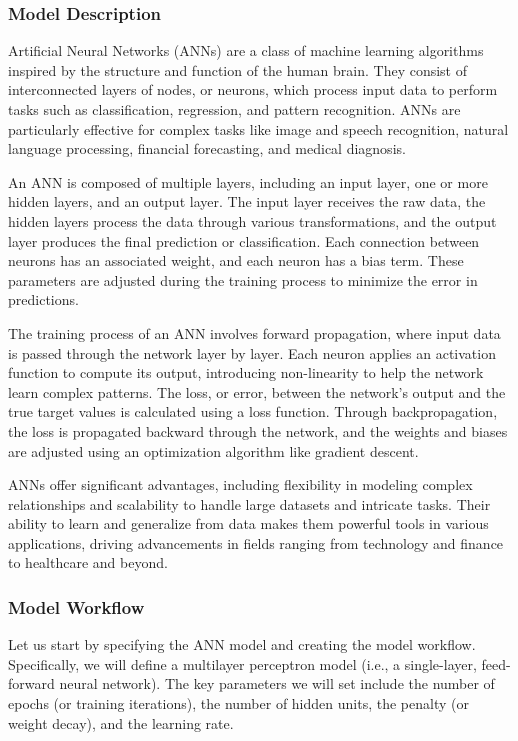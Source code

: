 \documentclass[
  letterpaper,
  DIV=11,
  numbers=noendperiod]{scrartcl}
\begin{document}
\subsubsection{Model Description}\label{model-description-2}

Artificial Neural Networks (ANNs) are a class of machine learning
algorithms inspired by the structure and function of the human brain.
They consist of interconnected layers of nodes, or neurons, which
process input data to perform tasks such as classification, regression,
and pattern recognition. ANNs are particularly effective for complex
tasks like image and speech recognition, natural language processing,
financial forecasting, and medical diagnosis.

An ANN is composed of multiple layers, including an input layer, one or
more hidden layers, and an output layer. The input layer receives the
raw data, the hidden layers process the data through various
transformations, and the output layer produces the final prediction or
classification. Each connection between neurons has an associated
weight, and each neuron has a bias term. These parameters are adjusted
during the training process to minimize the error in predictions.

The training process of an ANN involves forward propagation, where input
data is passed through the network layer by layer. Each neuron applies
an activation function to compute its output, introducing non-linearity
to help the network learn complex patterns. The loss, or error, between
the network's output and the true target values is calculated using a
loss function. Through backpropagation, the loss is propagated backward
through the network, and the weights and biases are adjusted using an
optimization algorithm like gradient descent.

ANNs offer significant advantages, including flexibility in modeling
complex relationships and scalability to handle large datasets and
intricate tasks. Their ability to learn and generalize from data makes
them powerful tools in various applications, driving advancements in
fields ranging from technology and finance to healthcare and beyond.

\subsubsection{Model Workflow}\label{model-workflow-2}

Let us start by specifying the ANN model and creating the model
workflow. Specifically, we will define a multilayer perceptron model
(i.e., a single-layer, feed-forward neural network). The key parameters
we will set include the number of epochs (or training iterations), the
number of hidden units, the penalty (or weight decay), and the learning
rate.
\end{document}
